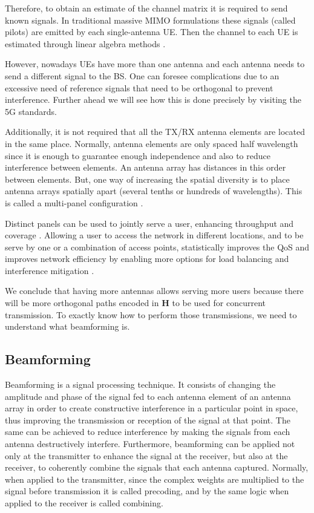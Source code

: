 Therefore, to obtain an estimate of the channel matrix it is required to send known signals. In traditional massive MIMO formulations these signals (called pilots) are emitted by each single-antenna \ac{UE}. Then the channel to each \ac{UE} is estimated through linear algebra methods \cite{fundamentals_of_massive_mimo}.

However, nowadays \acp{UE} have more than one antenna and each antenna needs to send a different signal to the \ac{BS}. One can foresee complications due to an excessive need of reference signals that need to be orthogonal to prevent interference. Further ahead we will see how this is done precisely by visiting the 5G standards. 

Additionally, it is not required that all the \ac{TX}/\ac{RX} antenna elements are located in the same place. Normally, antenna elements are only spaced half wavelength since it is enough to guarantee enough independence and also to reduce interference between elements. An antenna array has distances in this order between elements. But, one way of increasing the spatial diversity is to place antenna arrays spatially apart (several tenths or hundreds of wavelengths). This is called a multi-panel configuration \cite{8316768}. 

Distinct panels can be used to jointly serve a user, enhancing throughput and coverage \cite{6804225}. Allowing a user to access the network in different locations, and to be serve by one or a combination of access points, statistically improves the QoS and improves network efficiency by enabling more options for load balancing and interference mitigation \cite{dmimo_tno}.

We conclude that having more antennas allows serving more users because there will be more orthogonal paths encoded in $\bm{H}$ to be used for concurrent transmission. To exactly know how to perform those transmissions, we need to understand what beamforming is. 

\subsection*{Beamforming}

Beamforming is a signal processing technique. It consists of changing the amplitude and phase of the signal fed to each antenna element of an antenna array in order to create constructive interference in a particular point in space, thus improving the transmission or reception of the signal at that point. The same can be achieved to reduce interference by making the signals from each antenna destructively interfere. Furthermore, beamforming can be applied not only at the transmitter to enhance the signal at the receiver, but also at the receiver, to coherently combine the signals that each antenna captured. Normally, when applied to the transmitter, since the complex weights are multiplied to the signal before transmission it is called precoding, and by the same logic when applied to the receiver is called combining.

